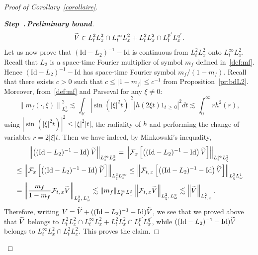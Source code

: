 \documentclass[10pt]{amsart}
\theoremstyle{definition}\newtheorem{defi}[theo]{Definition}\newtheorem{rema}[theo]{Remark}\newtheorem{exam}[theo]{Example}\newtheorem{exem}[theo]{Example}\newtheorem{nota}[theo]{Notation}
\newcommand{\R}{\mathbb{R}}
\newcommand{\Id}{\mathrm{Id}}
\newcommand{\mclF}{\mathcal{F}}
\newcounter{stepcount}
\newenvironment{step}[1]{\refstepcounter{stepcount}\begin{proof}[{\bf{Step~\thestepcount}{.\,\emph{#1}}}]}{\let\qed\relax\end{proof}}
\let\oldtilde\tilde
\renewcommand*{\tilde}[1]{\mathchoice{\widetilde{#1}}{\widetilde{#1}}{\oldtilde{#1}}{\oldtilde{#1}}}
\begin{document}
\begin{proof}[Proof of Corollary~\ref{corollaire}]
\begin{step}{{Preliminary bound}}
\[
\tilde V \in L^2_tL^2_x\cap L^{\infty}_tL^2_x+ L^2_tL^2_x\cap L^{p'}_tL^{q'}_x.
\]
Let us now prove that $(\Id-L_2)^{-1}-\Id$ is continuous from $L^2_tL^2_x$ onto $L^{\infty}_tL^{2}_x$. Recall that $L_2$ is a space-time Fourier multiplier of symbol $m_f$ defined in~\eqref{def:mf}. Hence $(\Id-L_2)^{-1}-\Id$ has space-time Fourier symbol $m_f/(1-m_f)$. Recall that there exists $c>0$ such that $c\leq |1-m_f|\leq c^{-1}$ from Proposition~\ref{pr:bdL2}. Moreover, from~\eqref{def:mf} and Parseval for any $\xi\neq 0$:
\[
\left\| m_f(\cdot,\xi)\right\|_{L^{2}_\omega}^2\lesssim \int_{\R} \left|\sin\left(|\xi|^2t\right)\right|^2 \left|h(2\xi t)1_{t\,\geq\,0}\right|^2dt \lesssim \int_0^\infty rh^2(r),
\]
using $|\sin(|\xi|^2t)|^2\leq |\xi|^2|t|$, the radiality of $h$ and performing the change of variables $r=2|\xi| t$. Then we have indeed, by Minkowski's inequality,
\begin{multline*}
\left\|\left((\Id-L_2)^{-1}-\Id\right)\tilde V\right\|_{L^\infty_t L^2_x}
=\left\|\mclF_x\left[\left((\Id-L_2)^{-1}-\Id\right)\tilde V\right]\right\|_{L^\infty_t L^2_\xi}\\
\begin{aligned}
&\leq \left\| \mclF_x\left[\left((\Id-L_2)^{-1}-\Id\right)\tilde V\right]\right\|_{L^2_\xi L^\infty_t}
\leq \left\| \mclF_{t,\,x}\left[\left((\Id-L_2)^{-1}-\Id\right)\tilde V\right]\right\|_{L^2_\xi L^1_\omega}\\
&= \left\|\frac{m_f}{1-m_f}\mclF_{t,\,x}\tilde V\right\|_{L^2_\xi,\,L^1_\omega}
\lesssim \| m_f\|_{L^{\infty}_\xi L^{2}_\omega}\left\| \mclF_{t,\,x}\tilde V\right\|_{L^2_\xi,\,L^2_\omega}\lesssim \left\| \tilde V \right\|_{L^2_{t,\,x}}.
\end{aligned}
\end{multline*}
Therefore, writing $V=\tilde V+((\Id-L_2)^{-1}-\Id)\tilde V$, we see that we proved above that $\tilde V$ belongs to $L^2_tL^2_x\cap L^{\infty}_tL^2_x+ L^2_tL^2_x\cap L^{p'}_tL^{q'}_x$, while $((\Id-L_2)^{-1}-\Id)\tilde V$ belongs to $L^{\infty}_tL^{2}_x\cap L^2_tL^2_x$. This proves the claim.
\end{step}


\end{proof}
\end{document}
